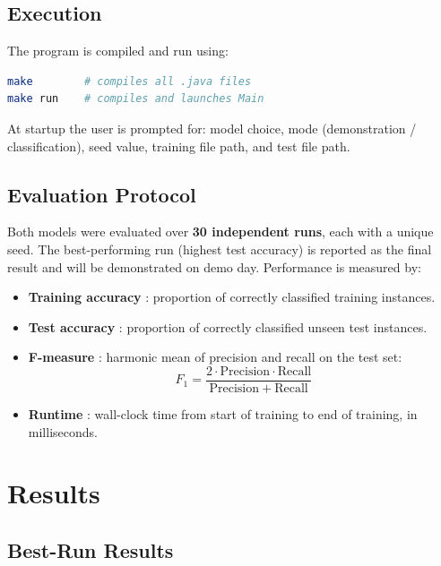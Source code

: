 \documentclass[12pt,a4paper]{article}
\begin{document}
\subsection{Execution}

The program is compiled and run using:

\begin{lstlisting}[language=bash]
make        # compiles all .java files
make run    # compiles and launches Main
\end{lstlisting}

At startup the user is prompted for: model choice, mode (demonstration / classification), seed value, training file path, and test file path.

\subsection{Evaluation Protocol}

Both models were evaluated over \textbf{30 independent runs}, each with a unique seed. The best-performing run (highest test accuracy) is reported as the final result and will be demonstrated on demo day. Performance is measured by:

\begin{itemize}
    \item \textbf{Training accuracy} : proportion of correctly classified training instances.
    \item \textbf{Test accuracy} : proportion of correctly classified unseen test instances.
    \item \textbf{F-measure} : harmonic mean of precision and recall on the test set:
    \[
        F_1 = \frac{2 \cdot \mathrm{Precision} \cdot \mathrm{Recall}}{\mathrm{Precision} + \mathrm{Recall}}
    \]
    \item \textbf{Runtime} : wall-clock time from start of training to end of training, in milliseconds.
\end{itemize}

\section{Results}
\label{sec:results}

\subsection{Best-Run Results}
\end{document}
